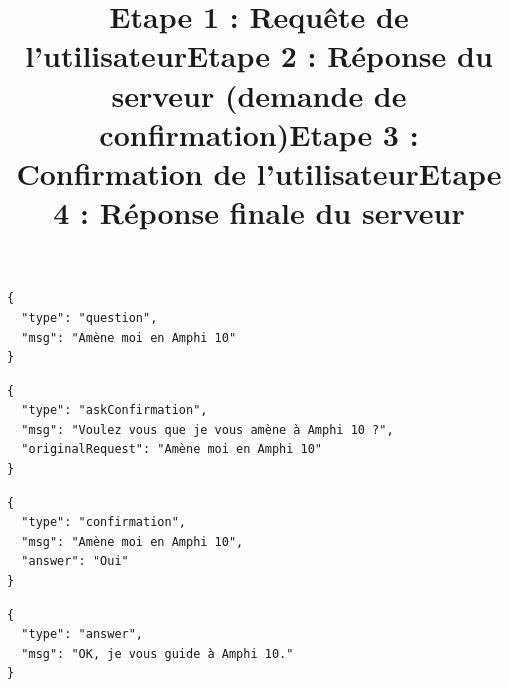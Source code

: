 \documentclass{report}
\begin{document}
        \begin{listing}[h]
          \begin{verbatim}
{
  "type": "question",
  "msg": "Amène moi en Amphi 10"
}
          \end{verbatim}
          \title{Etape 1 : Requête de l'utilisateur}
        \end{listing}
        \begin{listing}[h]
          \begin{verbatim}
{
  "type": "askConfirmation",
  "msg": "Voulez vous que je vous amène à Amphi 10 ?",
  "originalRequest": "Amène moi en Amphi 10"
}
          \end{verbatim}
          \title{Etape 2 : Réponse du serveur (demande de confirmation)}

          \begin{verbatim}
{
  "type": "confirmation",
  "msg": "Amène moi en Amphi 10",
  "answer": "Oui"
}
          \end{verbatim}
          \title{Etape 3 : Confirmation de l'utilisateur}

          \begin{verbatim}
{
  "type": "answer",
  "msg": "OK, je vous guide à Amphi 10."
}
          \end{verbatim}
          \title{Etape 4 : Réponse finale du serveur}
        \end{listing}
\end{document}
